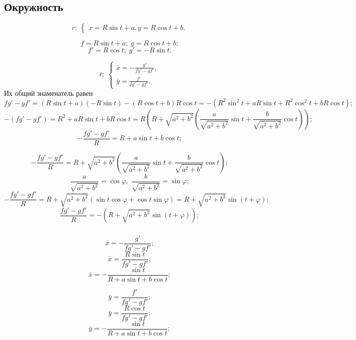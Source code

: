 \subsection{Окружность}
$$r: \: 
\left\{ \begin{gathered}
	x = R\sin{t}+a,
	y = R\cos{t}+b.
\end{gathered} \right.
$$

$$f = R\sin{t}+a; \; g = R\cos{t}+b;$$
$$f' = R\cos{t}; \; g' = -R\sin{t}.$$

$$\bar{r}:
\:
\left\{
\begin{gathered}
	\bar{x} =  -\frac{g'}{f g' - g f'},\\
	\bar{y} =  \frac{f'}{f g' - g f'}.
\end{gathered}
\right.
$$
Их общий знаменатель равен
$$f g' - g f' = (R\sin{t}+a)(-R\sin{t}) - (R\cos{t}+b) R\cos{t} = -\left(R^2\sin^2{t}+aR\sin{t} + R^2\cos^2{t} +bR\cos{t}\right);$$
$$-(f g' - g f') = R^2 + aR\sin{t} + bR\cos{t} = R\left(R + \sqrt{a^2+b^2}\left(\frac{a}{\sqrt{a^2+b^2}}\sin{t} + \frac{b}{\sqrt{a^2+b^2}}\cos{t}\right)\right);$$
$$-\frac{f g' - g f'}{R} = R + a\sin{t} + b\cos{t};$$

$$-\frac{f g' - g f'}{R} = R + \sqrt{a^2+b^2}\left(\frac{a}{\sqrt{a^2+b^2}}\sin{t} + \frac{b}{\sqrt{a^2+b^2}}\cos{t}\right);$$
$$\frac{a}{\sqrt{a^2+b^2}} =\cos\varphi, \; \frac{b}{\sqrt{a^2+b^2}} = \sin\varphi;$$
$$-\frac{f g' - g f'}{R} = R + \sqrt{a^2+b^2}\left(\sin{t}\cos\varphi + \cos{t}\sin\varphi\right) = R + \sqrt{a^2+b^2}\sin{\left(t + \varphi \right)};$$
$$\frac{f g' - g f'}{R} = - \left( R + \sqrt{a^2+b^2}\sin{\left(t + \varphi \right)} \right);$$


\subparagraph{}
\begin{minipage}{0.4\textwidth}
$$\bar{x} =  -\frac{g'}{f g' - g f'};$$
$$\bar{x} =  \frac{R \sin{t}}{f g' - g f'};$$
$$\bar{x} =  -\frac{\sin{t}}{R + a\sin{t} + b\cos{t}};$$

\end{minipage}
\begin{minipage}{0.4\textwidth}
$$\bar{y} =  \frac{f'}{f g' - g f'};$$
$$\bar{y} =  \frac{R \cos{t}}{f g' - g f'};$$
$$\bar{y} =  -\frac{\sin{t}}{R + a\sin{t} + b\cos{t}};$$

\end{minipage}